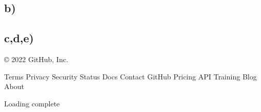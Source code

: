 \clearpage
\subsection*{b)}


\clearpage
\subsection*{c,d,e)}





    © 2022 GitHub, Inc.

    Terms
    Privacy
    Security
    Status
    Docs
    Contact GitHub
    Pricing
    API
    Training
    Blog
    About

Loading complete
